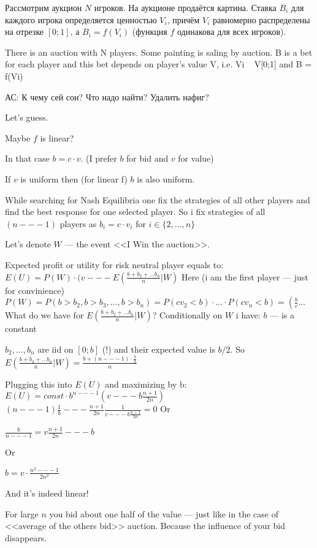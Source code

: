 \begin{problem}

Рассмотрим аукцион $N$ игроков. На аукционе продаётся картина. Ставка $B_i$ для каждого игрока определяется ценностью $V_i$, причём $V_i$ равномерно распределены на отрезке $[0;1]$, а $B_i = f(V_i)$ (функция $f$ одинакова для всех игроков).

There is an auction with N players. Some painting is saling by auction. B is a bet for each player and this bet depends on player's value V, i.e. Vi ~ V[0;1] and B = f(Vi)

{\red АС: К чему сей сон? Что надо найти? Удалить нафиг?}


\begin{sol}

Let's guess.\par

Maybe $f$ is linear? \par
In that case $b = c\cdot v$. (I prefer $b$ for bid and $v$ for value) \par
If $v$ is uniform then (for linear f) $b$ is also uniform. \par

While searching for Nash Equilibria one fix the strategies of all other players and find the best response for one selected player. So i fix strategies of all $(n --- 1)$ players as $b_{i} = c\cdot v_{i}$ for $i\in\{2,\ldots,n\}$\par

Let's denote $W$ --- the event <<I Win the auction>>.\par

Expected profit or utility for risk neutral player equals to:
$E(U) = P(W)\cdot (v --- E(\frac {b + b_{2} + \ldots b_{n}}{n}|W)$
Here (i am the first player --- just for convinience)
$P(W) = P(b > b_{2}, b > b_{3}, \ldots, b > b_{n}) = P(cv_{2} < b)\cdot\ldots \cdot P(cv_{n} < b) = \left(\frac {b}{c}\right. \ldots$
What do we have for $E\left(\frac {b + b_{2} + \ldots b_{n}}{n}|W\right)$?
Conditionally on $W$ i have:
$b$ --- is a constant\par
$b_{2}, \ldots,b_{n}$ are iid on $[0;b]$ (!) and their expected value is $b/2$.
So $E\left(\frac {b + b_{2} + \ldots b_{n}}{n}|W\right) = \frac {b + (n --- 1)\cdot \frac {b}{2}}{n}$ \par

Plugging this into $E(U)$ and maximizing by b:
$E(U) = const\cdot b^{n --- 1}(v --- b\frac {n + 1}{2n})$
$(n --- 1)\frac {1}{b} --- \frac {n + 1}{2n}\frac {1}{v --- b\frac {n + 1}{2n}} = 0$
Or\par
$\frac {b}{n --- 1} = v\frac {n + 1}{2n} --- b$\par
Or\par
$b = v\cdot \frac {n^2 --- 1}{2n^{2}}$\par
And it's indeed linear!\par

For large $n$ you bid about one half of the value --- just like in the case of <<average of the others bid>> auction. Because the influence of your bid disappears.
\end{sol}
\end{problem}




